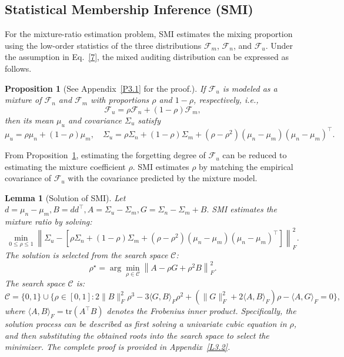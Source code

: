 \documentclass{article}
\theoremstyle{plain}
\newtheorem{proposition}[theorem]{Proposition}
\newtheorem{lemma}[theorem]{Lemma}
\theoremstyle{definition}
\theoremstyle{remark}
\begin{document}
\subsection{Statistical Membership Inference (SMI)}
For the mixture-ratio estimation problem, SMI estimates the mixing proportion using the low-order statistics of the three distributions $\mathcal F_m$, $\mathcal F_n$, and $\mathcal F_u$. Under the assumption in Eq.~\eqref{7}, the mixed auditing distribution can be expressed as follows.
\begin{proposition}[See Appendix~\ref{P3.1} for the proof.]\label{P1}
If $\mathcal F_u$ is modeled as a mixture of $\mathcal F_n$ and $\mathcal F_m$ with proportions $\rho$ and $1-\rho$, respectively, i.e.,
\begin{equation}
    \mathcal F_u=\rho \mathcal F_n +(1-\rho)\mathcal F_m,
\end{equation}
then its mean $\mu_u$ and covariance $\Sigma_u$ satisfy
\begin{equation}
        \mu_u=\rho \mu_n+(1-\rho)\mu_m,\quad
        \Sigma_u=\rho \Sigma_n+(1-\rho)\Sigma_m
        +(\rho-\rho^2)(\mu_n-\mu_m)(\mu_n-\mu_m)^\top.
\end{equation}
\end{proposition}
From Proposition~\ref{P1}, estimating the forgetting degree of $\mathcal F_u$ can be reduced to estimating the mixture coefficient $\rho$. SMI estimates $\rho$ by matching the empirical covariance of $\mathcal F_u$ with the covariance predicted by the mixture model.
\begin{lemma}[Solution of SMI]
Let
$d=\mu_n-\mu_m,B=dd^\top,
A=\Sigma_u-\Sigma_m,
G=\Sigma_n-\Sigma_m+B .$
SMI estimates the mixture ratio by solving:
\begin{equation}
\min_{0\le\rho\le 1}\left\|
\Sigma_u-
\left[
\rho \Sigma_n+(1-\rho)\Sigma_m
+(\rho-\rho^2)(\mu_n-\mu_m)(\mu_n-\mu_m)^\top
\right]
\right\|^2_F. \label{youhauwentismi}
\end{equation}
The solution is selected from the search space $\mathcal C$:
\begin{equation}
\rho^\star=
\arg\min_{\rho\in\mathcal C}
\left\|A-\rho G+\rho^2 B\right\|_F^2. \label{SMI-J}
\end{equation}
The search space $\mathcal C$ is:
\begin{equation}
\mathcal C
=
\{0,1\}
\cup
\Big\{
\rho\in[0,1]:
2\|B\|_F^2\rho^3
-3\langle G,B\rangle_F\rho^2 +
\left(\|G\|_F^2+2\langle A,B\rangle_F\right)\rho
-\langle A,G\rangle_F
=0
\Big\},
\end{equation}
where \(\langle A,B\rangle_F=\mathrm{tr}(A^\top B)\) denotes the Frobenius inner product. Specifically, the solution process can be described as first solving a univariate cubic equation in $\rho$, and then substituting the obtained roots into the search space to select the minimizer. The complete proof is provided in Appendix~\ref{L3.2}. \label{lemmaSMI}
\end{lemma}
\end{document}
